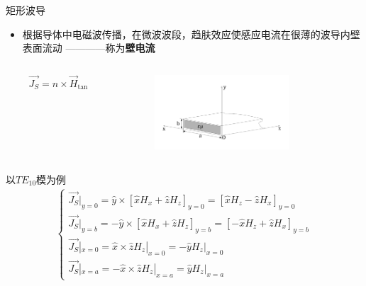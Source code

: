 \begin{frame}{矩形波导}
    \begin{itemize}
        \item 根据导体中电磁波传播，在微波波段，趋肤效应使感应电流在很薄的波导内壁表面流动  ————称为\textbf{壁电流}
    \end{itemize}
    \begin{columns}
        \begin{column}{0.5\linewidth}
            $$\vec{J_S}=\hat{n}\times\vec{H}_{\tan}$$
        \end{column}
        \begin{column}{0.5\linewidth}
            \begin{figure}
                \includegraphics[width=5cm]{Cha6//fig6-3.pdf}
            \end{figure}
        \end{column}
    \end{columns}
    以$TE_{10}$模为例
    \begin{align*}
        \begin{cases}
            \vec{J_S}|_{y=0}=\hat{y}\times[\hat{x}H_x+\hat{z}H_z]_{y=0}=[\hat{x}H_z-\hat{z}H_x]_{y=0}\\
            \vec{J_S}|_{y=b}=-\hat{y}\times[\hat{x}H_x+\hat{z}H_z]_{y=b}=[-\hat{x}H_z+\hat{z}H_x]_{y=b}\\
            \vec{J_S}|_{x=0}=\hat{x}\times\hat{z}H_z|_{x=0}=-\hat{y}H_z|_{x=0}\\
            \vec{J_S}|_{x=a}=-\hat{x}\times\hat{z}H_z|_{x=a}=\hat{y}H_z|_{x=a}
        \end{cases}
    \end{align*}
\end{frame}

